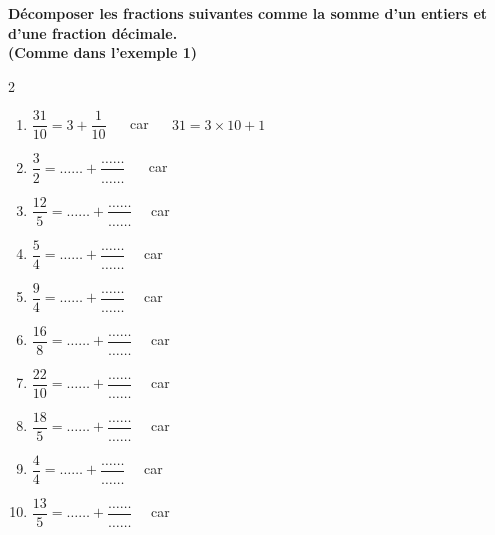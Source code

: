 \documentclass[10pt]{article}
\begin{document}
\begin{exercicedevoir}
\textbf{Décomposer les fractions suivantes comme la somme d'un entiers
et d'une fraction décimale. \\ (Comme dans l'exemple 1)}
\begin{multicols}{2}
  \begin{enumerate}
  \item $ \dfrac{31}{10} = 3 + \dfrac{1}{10} $  $\quad$ car $\quad$ $31 = 3 \times 10 +
    1$
  \item $ \dfrac{3}{2} = \ldots\ldots +
    \dfrac{\ldots\ldots}{\ldots\ldots} $ $\quad$ car \dotfill
  \item $ \dfrac{12}{5} = \ldots\ldots +
    \dfrac{\ldots\ldots}{\ldots\ldots} $$\quad$ car \dotfill
  \item $ \dfrac{5}{4} = \ldots\ldots +
    \dfrac{\ldots\ldots}{\ldots\ldots} $$\quad$ car \dotfill
  \item $ \dfrac{9}{4} = \ldots\ldots +
    \dfrac{\ldots\ldots}{\ldots\ldots} $$\quad$ car \dotfill
  \item $ \dfrac{16}{8} = \ldots\ldots +
    \dfrac{\ldots\ldots}{\ldots\ldots} $$\quad$ car \dotfill
  \item $ \dfrac{22}{10} = \ldots\ldots +
    \dfrac{\ldots\ldots}{\ldots\ldots} $$\quad$ car \dotfill
  \item $ \dfrac{18}{5} = \ldots\ldots +
    \dfrac{\ldots\ldots}{\ldots\ldots} $$\quad$ car \dotfill
  \item $ \dfrac{4}{4} = \ldots\ldots +
    \dfrac{\ldots\ldots}{\ldots\ldots} $$\quad$ car \dotfill
  \item $ \dfrac{13}{5} = \ldots\ldots +
    \dfrac{\ldots\ldots}{\ldots\ldots} $$\quad$ car \dotfill
  \end{enumerate}
\end{multicols}
\end{exercicedevoir}
\end{document}
